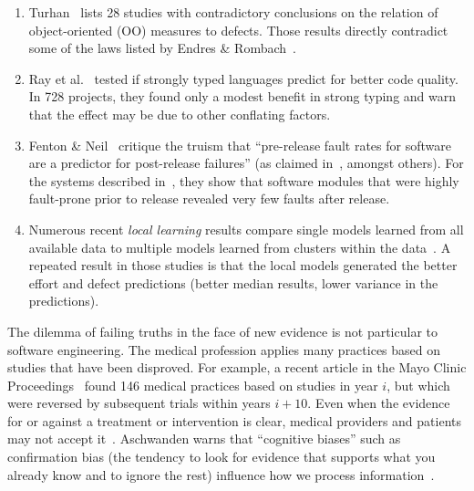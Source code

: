 \documentclass[smallcondensed]{svjour3}
\newcommand{\be}{\begin{enumerate}}
\newcommand{\ee}{\end{enumerate}}
\begin{document}
\be
\item
Turhan~\cite{me12d} lists 28 studies with contradictory conclusions
on the relation of object-oriented (OO) measures to defects.  Those results
 directly  contradict some of the laws listed by 
Endres \& Rombach~\cite{endres03}.
\item
Ray et al.~\cite{ray2014lang} tested if   strongly typed languages
predict for better code quality. In  728 projects,
they found  only a modest benefit in strong typing and warn that the effect may be due to other conflating factors.
\item
Fenton \& Neil~\cite{fenton00,fenton00b}   critique the truism that
``pre-release fault rates for software
are a predictor for post-release failures'' (as claimed in~\cite{dunsmore88},
amongst others). For the systems described in~\cite{fenton97}, they
show that software modules that were highly fault-prone
prior to release revealed very few faults after release.
\item
Numerous recent {\em local learning} results compare single models
learned from all available data to multiple models learned from clusters within the data~\cite{betten14,yang11,yang13,minku13,me12d,me11m,betta12,posnett11}.
A repeated result in those studies is that the local models generated the better effort
and defect predictions (better median results,
lower variance in the predictions).
\ee
 
The dilemma of failing truths in the face of new evidence is not particular to software engineering. 
The medical profession applies  many practices based on studies
that have been disproved. For example,
a  recent article
in the Mayo Clinic Proceedings~\cite{prasad13} found  
146 medical practices based on studies 
in year $i$, but which were  reversed by subsequent trials within years $i+10$.
Even when the evidence for or against a treatment or intervention is clear, medical providers and patients may not accept it~\cite{aschwanden10}.
Aschwanden warns that ``cognitive biases''  such as  confirmation bias (the tendency to look for evidence that supports what you already know and to ignore the rest)  influence how we process information~\cite{aschwanden15}.
\end{document}
